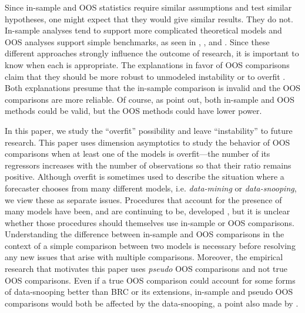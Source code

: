 \documentclass[12pt,draft]{article}
\begin{document}
Since in-sample and OOS statistics require similar assumptions and
test similar hypotheses, one might expect that they would give similar
results.  They do not.  In-sample analyses tend to support more
complicated theoretical models and OOS analyses support simple
benchmarks, as seen in \citet{MeR:83}, \citet{StW:03}, and
\citet{GoW:08}.  Since these different approaches strongly influence
the outcome of research, it is important to know when each is
appropriate.  The explanations in favor of OOS comparisons claim
that they should be more robust to unmodeled instability
\citep{ClM:05,GiW:06,GiR:09,GiR:10} or to overfit
\citep{Mcc:98,Cla:04}.  Both explanations presume that the in-sample
comparison is invalid and the OOS comparisons are more reliable.  Of
course, as \citet{InK:04,InK:06} point out, both in-sample and OOS
methods could be valid, but the OOS methods could have lower power.

In this paper, we study the ``overfit'' possibility and leave
``instability'' to future research. This paper uses dimension
asymptotics to study the behavior of OOS comparisons when at least
one of the models is overfit---the number of its regressors
increases with the number of observations so that their ratio remains
positive.  Although overfit is sometimes used to describe the
situation where a forecaster chooses from many different models,
i.e. \emph{data-mining} or \emph{data-snooping}, we view these as
separate issues.  Procedures that account for the presence of many
models have been, and are continuing to be, developed \citep[see, for
example,][]{Whi:00,Han:05,RoW:05,HHK:10,ClM:12b}, but it is unclear
whether those procedures should themselves use in-sample or OOS
comparisons.  Understanding the difference between in-sample and OOS
comparisons in the context of a simple comparison between two models
is necessary before resolving any new issues that arise with multiple
comparisons. Moreover, the empirical research that motivates
this paper uses \emph{pseudo} OOS comparisons and not
true OOS comparisons.  Even if a true OOS comparison
could account for some forms of data-snooping better than
 BRC or its extensions, in-sample and pseudo
OOS comparisons would both be affected by the data-snooping, a
point also made by \citet{InK:04}.
\end{document}
